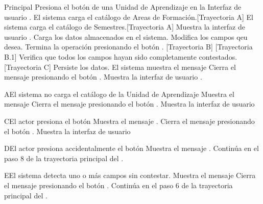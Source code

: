 \begin{UCtrayectoria}{Principal}
    \UCpaso[\UCactor] Presiona el botón  de una Unidad de Aprendizaje en la Interfaz de usuario  .
    \UCpaso El sistema carga el catálogo de Areas de Formación.[Trayectoria A]
    \UCpaso El sistema carga el catálogo de Semestres.[Trayectoria A]
    \UCpaso Muestra la interfaz de usuario .
    \UCpaso Carga los datos almacenados en el sistema.
    \UCpaso[\UCactor] Modifica los campos qeu desea.
    \UCpaso[\UCactor] Termina la operación presionando el botón . [Trayectoria B] [Trayectoria B.1]
    \UCpaso Verifica que todos los campos hayan sido completamente contestados. [Trayectoria C]
    \UCpaso Persiste los datos.
    \UCpaso El sistema muestra el mensaje 
    \UCpaso[\UCactor] Cierra el mensaje presionando el botón .
    \UCpaso Muestra la interfaz de usuario .
\end{UCtrayectoria}
\begin{UCtrayectoriaA}{A}{El sistema no carga el catálogo de la Unidad de Aprendizaje}
	\UCpaso Muestra el mensaje 
	\UCpaso[\UCactor] Cierra el mensaje presionando el botón .
	 \UCpaso Muestra la interfaz de usuario 
\end{UCtrayectoriaA}
\begin{UCtrayectoriaA}{C}{El actor presiona el botón }
	\UCpaso Muestra el mensaje .
	\UCpaso[\UCactor] Cierra el mensaje presionando el botón .
	\UCpaso Muestra la interfaz de usuario 
\end{UCtrayectoriaA}
\begin{UCtrayectoriaA}{D}{El actor presiona accidentalmente el botón }
	\UCpaso Muestra el mensaje .
    \UCpaso Continúa en el paso 8 de la trayectoria principal del .
\end{UCtrayectoriaA}
\begin{UCtrayectoriaA}{E}{El sistema detecta uno o más campos sin contestar.}
	\UCpaso Muestra el mensaje 
	\UCpaso[\UCactor] Cierra el mensaje presionando el botón .
    \UCpaso Continúa en el paso 6 de la trayectoria principal del .
\end{UCtrayectoriaA}